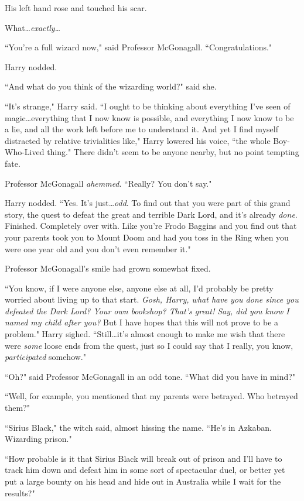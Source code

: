 His left hand rose and touched his scar.

What…\emph{exactly…}

``You're a full wizard now," said Professor McGonagall. ``Congratulations."

Harry nodded.

``And what do you think of the wizarding world?" said she.

``It's strange," Harry said. ``I ought to be thinking about everything I've seen of magic…everything that I now know is possible, and everything I now know to be a lie, and all the work left before me to understand it. And yet I find myself distracted by relative trivialities like," Harry lowered his voice, ``the whole Boy-Who-Lived thing." There didn't seem to be anyone nearby, but no point tempting fate.

Professor McGonagall \emph{ahemmed}. ``Really? You don't say."

Harry nodded. ``Yes. It's just…\emph{odd}. To find out that you were part of this grand story, the quest to defeat the great and terrible Dark Lord, and it's already \emph{done}. Finished. Completely over with. Like you're Frodo Baggins and you find out that your parents took you to Mount Doom and had you toss in the Ring when you were one year old and you don't even remember it."

Professor McGonagall's smile had grown somewhat fixed.

``You know, if I were anyone else, anyone else at all, I'd probably be pretty worried about living up to that start. \emph{Gosh, Harry, what have you done since you defeated the Dark Lord? Your own bookshop? That's great! Say, did you know I named my child after you?} But I have hopes that this will not prove to be a problem." Harry sighed. ``Still…it's almost enough to make me wish that there were \emph{some} loose ends from the quest, just so I could say that I really, you know, \emph{participated} somehow."

``Oh?" said Professor McGonagall in an odd tone. ``What did you have in mind?"

``Well, for example, you mentioned that my parents were betrayed. Who betrayed them?"

``Sirius Black," the witch said, almost hissing the name. ``He's in Azkaban. Wizarding prison."

``How probable is it that Sirius Black will break out of prison and I'll have to track him down and defeat him in some sort of spectacular duel, or better yet put a large bounty on his head and hide out in Australia while I wait for the results?"

